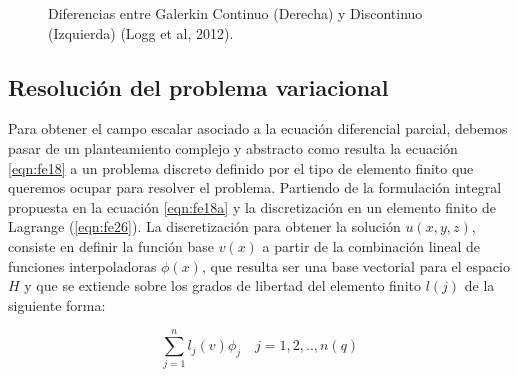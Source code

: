 \begin{figure}[htbp]
\centering
{}
\caption{Diferencias entre Galerkin Continuo (Derecha) y Discontinuo (Izquierda) (Logg et al, 2012).} \label{Figura19:2}
\end{figure} 


\subsection{Resolución del problema variacional}

Para obtener el campo escalar asociado a la ecuación diferencial parcial, debemos pasar de un planteamiento complejo y abstracto como resulta la ecuación \ref{eqn:fe18} a un problema discreto definido por el tipo de elemento finito que queremos ocupar para resolver el problema. Partiendo de la formulación integral propuesta en la ecuación \ref{eqn:fe18a} y la discretización en un elemento finito de Lagrange (\ref{eqn:fe26}). 
La discretización para obtener la solución $u(x,y,z)$, consiste en definir la función base $v(x)$ a partir de la combinación lineal de funciones interpoladoras $\phi(x)$, que resulta ser una base vectorial para el espacio $H$ y que se extiende sobre los grados de libertad del elemento finito $l(j)$ de la siguiente forma:


 \begin{equation}
 \label{eqn:fe31}
\displaystyle\sum_{j=1}^n  l_{j}(v)\phi_{j}  \quad  j=1,2,..,n(q)     
\end{equation} 

